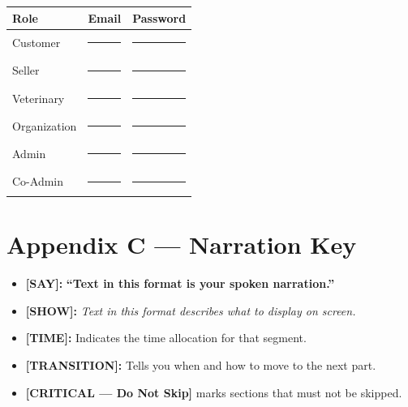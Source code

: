 \documentclass[12pt,a4paper]{article}
\newcommand{\say}[1]{\textbf{\textcolor{narration}{[SAY]:}} \textbf{``#1''}}
\newcommand{\show}[1]{\textbf{\textcolor{screen}{[SHOW]:}} \textit{#1}}
\newcommand{\timing}[1]{\textbf{\textcolor{timing}{[TIME]:}} #1}
\newcommand{\trans}[1]{\textbf{\textcolor{transition}{[TRANSITION]:}} #1}
\newcommand{\critical}{\textcolor{critical}{\textbf{[CRITICAL --- Do Not Skip]}}}
\begin{document}
\begin{tcolorbox}[colback=gray!5, colframe=gray!50!black, title=\textbf{Demo Accounts (fill in before recording)}]
\begin{longtable}{@{} l l l @{}}
  \toprule
  \textbf{Role} & \textbf{Email} & \textbf{Password} \\
  \midrule
  Customer      & \rule{5cm}{0.4pt} & \rule{3cm}{0.4pt} \\
  Seller        & \rule{5cm}{0.4pt} & \rule{3cm}{0.4pt} \\
  Veterinary    & \rule{5cm}{0.4pt} & \rule{3cm}{0.4pt} \\
  Organization  & \rule{5cm}{0.4pt} & \rule{3cm}{0.4pt} \\
  Admin         & \rule{5cm}{0.4pt} & \rule{3cm}{0.4pt} \\
  Co-Admin      & \rule{5cm}{0.4pt} & \rule{3cm}{0.4pt} \\
  \bottomrule
\end{longtable}
\end{tcolorbox}

\vspace{0.5cm}

\section*{Appendix C --- Narration Key}

\begin{tcolorbox}[colback=blue!3, colframe=blue!40!black]
\begin{itemize}[nosep]
  \item \say{Text in this format is your spoken narration.}
  \item \show{Text in this format describes what to display on screen.}
  \item \timing{Indicates the time allocation for that segment.}
  \item \trans{Tells you when and how to move to the next part.}
  \item \critical{} marks sections that must not be skipped.
\end{itemize}
\end{tcolorbox}
\end{document}
